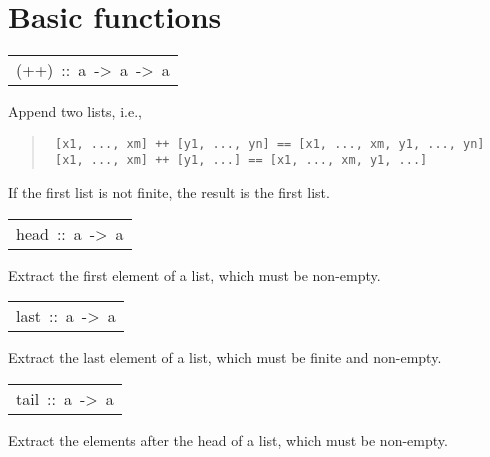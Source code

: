 \section{Basic functions
}
\begin{haddockdesc}
\item[\begin{tabular}{@{}l}
(++)\ ::\ {\char 91}a{\char 93}\ ->\ {\char 91}a{\char 93}\ ->\ {\char 91}a{\char 93}
\end{tabular}]\haddockbegindoc
Append two lists, i.e.,
\par
\begin{quote}
{\haddockverb\begin{verbatim}
 [x1, ..., xm] ++ [y1, ..., yn] == [x1, ..., xm, y1, ..., yn]
 [x1, ..., xm] ++ [y1, ...] == [x1, ..., xm, y1, ...]
\end{verbatim}}
\end{quote}
If the first list is not finite, the result is the first list.
\par

\end{haddockdesc}
\begin{haddockdesc}
\item[\begin{tabular}{@{}l}
head\ ::\ {\char 91}a{\char 93}\ ->\ a
\end{tabular}]\haddockbegindoc
Extract the first element of a list, which must be non-empty.
\par

\end{haddockdesc}
\begin{haddockdesc}
\item[\begin{tabular}{@{}l}
last\ ::\ {\char 91}a{\char 93}\ ->\ a
\end{tabular}]\haddockbegindoc
Extract the last element of a list, which must be finite and non-empty.
\par

\end{haddockdesc}
\begin{haddockdesc}
\item[\begin{tabular}{@{}l}
tail\ ::\ {\char 91}a{\char 93}\ ->\ {\char 91}a{\char 93}
\end{tabular}]\haddockbegindoc
Extract the elements after the head of a list, which must be non-empty.
\par

\end{haddockdesc}

